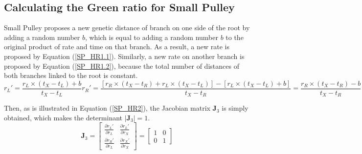 \documentclass{bmcart}
\begin{document}
\begin{backmatter}
\subsection*{Calculating the Green ratio for Small Pulley}
Small Pulley proposes a new genetic distance of branch on one side of the root by adding a random number $b$, which is equal to adding a random number $b$ to the original product of rate and time on that branch. As a result, a new rate is proposed by Equation (\ref{SP_HR1.1}). Similarly, a new rate on another branch is proposed by Equation (\ref{SP_HR1.2}), because the total number of distances of both branches linked to the root is constant. 
\begin{subequations}\label{SP_HR1}
\begin{equation}\label{SP_HR1.1}
{r_L}' = \frac{{{r_L} \times ({t_X} - {t_L}) + b}}{{{t_X} - {t_L}}} 
\end{equation}  
\begin{equation}\label{SP_HR1.2}
{r_R}' = \frac{{[{r_R} \times ({t_X} - {t_R}) + {r_L} \times ({t_X} - {t_L})] - [{r_L} \times ({t_X} - {t_L}) + b]}}{{{t_X} - {t_R}}} = \frac{{{r_R} \times ({t_X} - {t_R}) - b}}{{{t_X} - {t_R}}}
\end{equation}  
\end{subequations}  

Then, as is illustrated in Equation (\ref{SP_HR2}), the Jacobian matrix ${{\mathbf{J}}_3}$ is simply obtained, which makes the determinant $\left| {{{\mathbf{J}}_3}} \right| = 1$.
\begin{equation}\label{SP_HR2}
{{\mathbf{J}}_3} = \left[ {\begin{array}{*{20}{c}}
  {\frac{{\partial {r_L}'}}{{\partial {r_L}}}}&{\frac{{\partial {r_L}'}}{{\partial {r_X}}}} \\ 
  {\frac{{\partial {r_R}'}}{{\partial {r_L}}}}&{\frac{{\partial {r_X}'}}{{\partial {r_X}}}} 
\end{array}} \right] = \left[ {\begin{array}{*{20}{c}}
  1&0 \\ 
  0&1 
\end{array}} \right]
\end{equation}  

\end{backmatter}
\end{document}
